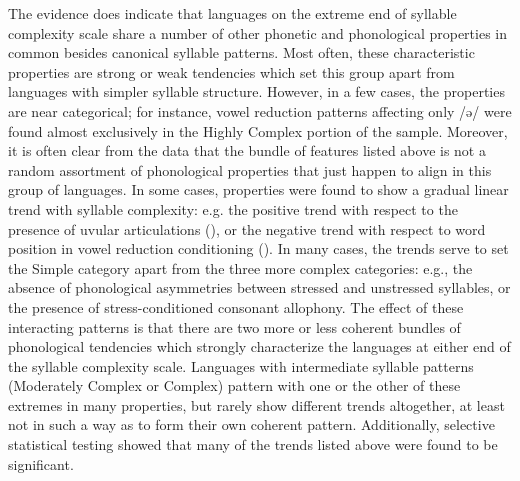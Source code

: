   The evidence does indicate that languages on the extreme end of syllable complexity scale share a number of other phonetic and phonological properties in common besides canonical syllable patterns. Most often, these characteristic properties are strong or weak tendencies which set this group apart from languages with simpler syllable structure. However, in a few cases, the properties are near categorical; for instance, vowel reduction patterns affecting only /ə/ were found almost exclusively in the Highly Complex portion of the sample. Moreover, it is often clear from the data that the bundle of features listed above is not a random assortment of phonological properties that just happen to align in this group of languages. In some cases, properties were found to show a gradual linear trend with syllable complexity: e.g. the positive trend with respect to the presence of uvular articulations (), or the negative trend with respect to word position in vowel reduction conditioning (). In many cases, the trends serve to set the Simple category apart from the three more complex categories: e.g., the absence of phonological asymmetries between stressed and unstressed syllables, or the presence of stress-conditioned consonant allophony. The effect of these interacting patterns is that there are two more or less coherent bundles of phonological tendencies which strongly characterize the languages at either end of the syllable complexity scale. Languages with intermediate syllable patterns (Moderately Complex or Complex) pattern with one or the other of these extremes in many properties, but rarely show different trends altogether, at least not in such a way as to form their own coherent pattern. Additionally, selective statistical testing showed that many of the trends listed above were found to be significant.


